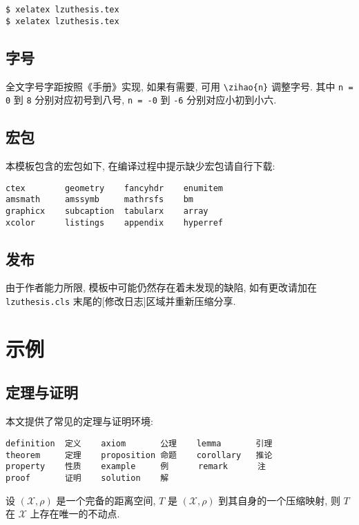 \documentclass{lzuthesis}
\begin{document}
\begin{verbatim}
$ xelatex lzuthesis.tex
$ xelatex lzuthesis.tex
\end{verbatim}

\subsection{字号}

全文字号字距按照《手册》实现, 如果有需要, 可用 \verb|\zihao{n}| 调整字号. 其中 \verb|n = 0| 到 \verb|8| 分别对应初号到八号, \verb|n = -0| 到 \verb|-6| 分别对应小初到小六.

\subsection{宏包}

本模板包含的宏包如下, 在编译过程中提示缺少宏包请自行下载:

\begin{verbatim}
ctex        geometry    fancyhdr    enumitem
amsmath     amssymb     mathrsfs    bm
graphicx    subcaption  tabularx    array
xcolor      listings    appendix    hyperref
\end{verbatim}

\subsection{发布}

由于作者能力所限, 模板中可能仍然存在着未发现的缺陷, 如有更改请加在
\texttt{lzuthesis.cls} 末尾的[修改日志]区域并重新压缩分享. 

\section{示例}

\subsection{定理与证明}

本文提供了常见的定理与证明环境:

\begin{verbatim}
definition  定义    axiom       公理    lemma       引理
theorem     定理    proposition 命题    corollary   推论
property    性质    example     例      remark      注
proof       证明    solution    解
\end{verbatim}

\begin{theorem}
	\label{thm1}
	设 $(\mathscr{X}, \rho)$ 是一个完备的距离空间, $T$ 是 $(\mathscr{X},
	\rho)$ 到其自身的一个压缩映射, 则 $T$ 在 $\mathscr{X}$
	上存在唯一的不动点.
\end{theorem}
\end{document}
